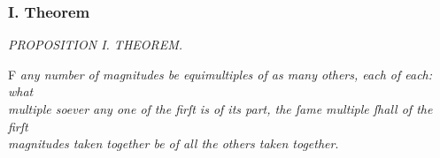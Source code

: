 \documentclass[12pt,preview]{standalone}
\begin{document}
\subsubsection{I. Theorem}

\begin{minipage}{\textwidth}

    \begin{center}
        \textit{PROPOSITION I. THEOREM.}\label{book5pr1} \\
    \end{center}

    \hfill

    \begin{center}
        \raggedright \lettrine[lines=4, loversize=1, nindent=0pt]{}{}F \textit{any number of magnitudes be equimultiples of as many others, each of each: what\\ multiple soever any one of the firſt is of its part, the ſame multiple ſhall of the firſt\\ magnitudes taken together be of all the others taken together}.
    \end{center}

    \hfill

    \hfill

    \newcommand{\reddomes}{\reddome\hspace{-0.75ex}\reddome\hspace{-0.75ex}\reddome\hspace{-0.75ex}\reddome\hspace{-0.75ex}\reddome}
    \newcommand{\yellowhomes}{\yellowhome\hspace{-0.75ex}\yellowhome\hspace{-0.75ex}\yellowhome\hspace{-0.75ex}\yellowhome\hspace{-0.75ex}\yellowhome}
    \newcommand{\bluedrops}{\bluedrop\hspace{-0.75ex}\bluedrop\hspace{-0.75ex}\bluedrop\hspace{-0.75ex}\bluedrop\hspace{-0.75ex}\bluedrop}


\end{minipage}
\end{document}
